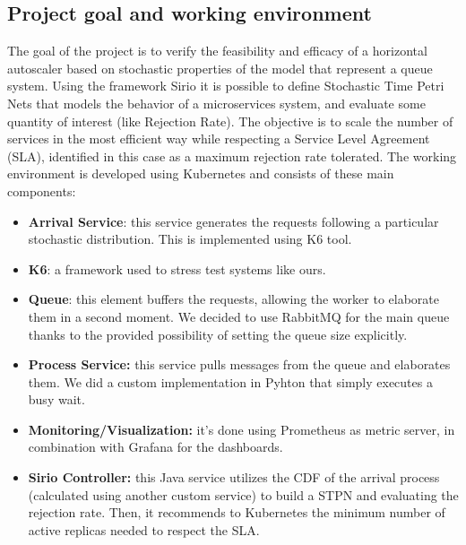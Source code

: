 \subsection{Project goal and working environment}
The goal of the project is to verify the feasibility and efficacy of a horizontal autoscaler based on stochastic properties of the model that represent a queue system. Using the framework Sirio it is possible to define Stochastic Time Petri Nets that models the behavior of a microservices system, and evaluate some quantity of interest (like Rejection Rate). The objective is to scale the number of services in the most efficient way while respecting a Service Level Agreement (SLA), identified in this case as a maximum rejection rate tolerated. The working environment is developed using Kubernetes and consists of these main components:
\begin{itemize}
    \item \textbf{Arrival Service}: this service generates the requests following a particular stochastic distribution. This is implemented using K6 tool.

    \item \textbf{K6}: a framework used to stress test systems like ours.

    \item \textbf{Queue}: this element buffers the requests, allowing the worker to elaborate them in a second moment. We decided to use RabbitMQ for the main queue thanks to the provided possibility of setting the queue size explicitly.

    \item \textbf{Process Service:} this service pulls messages from the queue and elaborates them. We did a custom implementation in Pyhton that simply executes a busy wait.
    
    \item \textbf{Monitoring/Visualization:} it’s done using Prometheus as metric server, in combination with Grafana for the dashboards.

    \item \textbf{Sirio Controller:} this Java service utilizes the CDF of the arrival process (calculated using another custom service) to build a STPN and evaluating the rejection rate. Then, it recommends to Kubernetes the minimum number of active replicas needed to respect the SLA.
    
\end{itemize}

\clearpage
